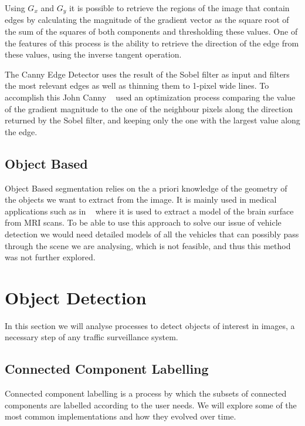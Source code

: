 Using $G_{x}$ and $G_{y}$ it is possible to retrieve the regions of the image that contain edges by calculating the magnitude of the gradient vector as the square root of the sum of the squares of both components and thresholding these values. One of the features of this process is the ability to retrieve the direction of the edge from these values, using the inverse tangent operation.

The Canny Edge Detector uses the result of the Sobel filter as input and filters the most relevant edges as well as thinning them to 1-pixel wide lines. To accomplish this John Canny ~\cite{canny_computational_1986} used an optimization process comparing the value of the gradient magnitude to the one of the neighbour pixels along the direction returned by the Sobel filter, and keeping only the one with the largest value along the edge.

\subsection{Object Based}

Object Based segmentation relies on the a priori knowledge of the geometry of the objects we want to extract from the image. It is mainly used in medical applications such as in ~\cite{snell_model-based_1993} where it is used to extract a model of the brain surface from MRI scans. To be able to use this approach to solve our issue of vehicle detection we would need detailed models of all the vehicles that can possibly pass through the scene we are analysing, which is not feasible, and thus this method was not further explored.

\section{Object Detection}

In this section we will analyse processes to detect objects of interest in images, a necessary step of any traffic surveillance system.

\subsection{Connected Component Labelling}

Connected component labelling is a process by which the subsets of connected components are labelled according to the user needs. We will explore some of the most common implementations and how they evolved over time.

